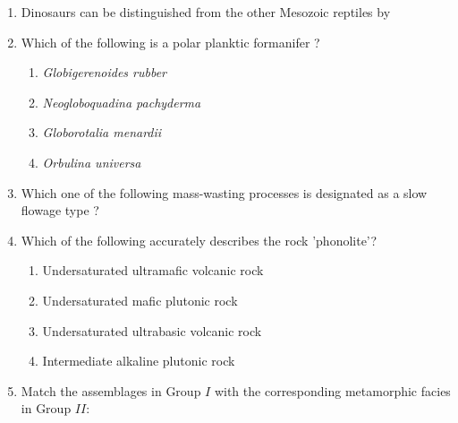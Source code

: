 \documentclass[journal,12pt,onecolumn]{IEEEtran}
\theoremstyle{remark}
\begin{document}
\begin{enumerate}
\begin {enumerate}
            \end{enumerate}
    \item Dinosaurs can be distinguished from the other Mesozoic reptiles by \hfill{} 
        \begin {enumerate}
            \end{enumerate}
    \item Which of the following is a polar planktic formanifer ? \hfill{} 
            \begin{enumerate}
                \item \textit{Globigerenoides rubber}
                \item \textit{Neogloboquadina pachyderma}
                \item \textit{Globorotalia menardii}
                \item \textit{Orbulina universa}                
            \end{enumerate}
    \item Which one of the following mass-wasting processes is designated as a slow flowage type ? \hfill{} 
    \begin {enumerate}
            \end{enumerate}
    \item Which of the following accurately describes the rock 'phonolite'? \hfill{} 
    \begin{enumerate}
                \item Undersaturated ultramafic volcanic rock
                \item Undersaturated mafic plutonic rock
                \item Undersaturated ultrabasic volcanic rock
                \item Intermediate alkaline plutonic rock
            \end{enumerate}
    \item Match the assemblages in Group $I$ with the corresponding metamorphic facies in Group $II$: \hfill{} 
        

\end{enumerate}
\end{document}
